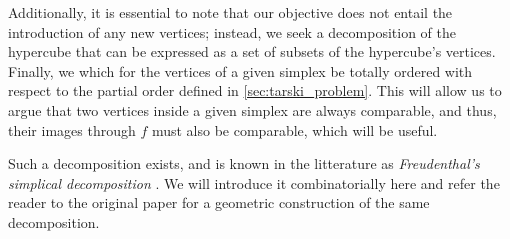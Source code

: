 Additionally, it is essential to note that our objective does not entail the introduction of any new vertices; instead, we seek a decomposition of the hypercube that can be expressed as a set of subsets of the hypercube's vertices. Finally, we which for the vertices of a given simplex be totally ordered with respect to the partial order defined in \cref{sec:tarski_problem}. This will allow us to argue that two vertices inside a given simplex are always comparable, and thus, their images through $f$ must also be comparable, which will be useful.

Such a decomposition exists, and is known in the litterature as \textit{Freudenthal's simplical decomposition} . We will introduce it combinatorially here and refer the reader to the original paper for a geometric construction of the same decomposition.

